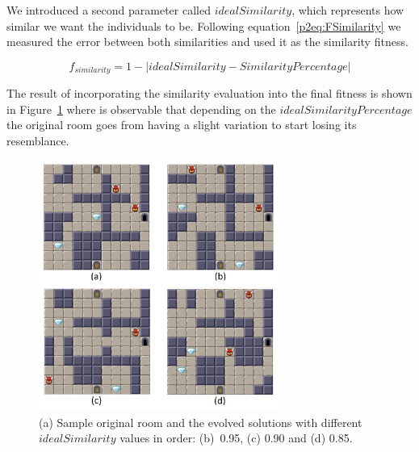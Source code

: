 

We introduced a second parameter called \(idealSimilarity\), which represents how similar we want the individuals to be. Following equation~\ref{p2eq:FSimilarity} we measured the error between both similarities and used it as the similarity fitness. 

\begin{equation} \label{p2eq:FSimilarity}
f_{similarity} = 1 - \left |idealSimilarity - SimilarityPercentage \right |
\end{equation}

The result of incorporating the similarity evaluation into the final fitness is shown in Figure~\ref{p2fig:similarity-result} where is observable that depending on the \(idealSimilarityPercentage\) the original room goes from having a slight variation to start losing its resemblance.

\begin{figure}
\centering
\includegraphics[width=0.7\textwidth]{included-papers-tex/paper-2/pap2-figures/figure-similarity.png}
\caption{(a) Sample original room and the evolved solutions with different \(idealSimilarity\) values in order: (b)~0.95, (c) 0.90 and (d) 0.85.}
\label{p2fig:similarity-result}
\end{figure}


